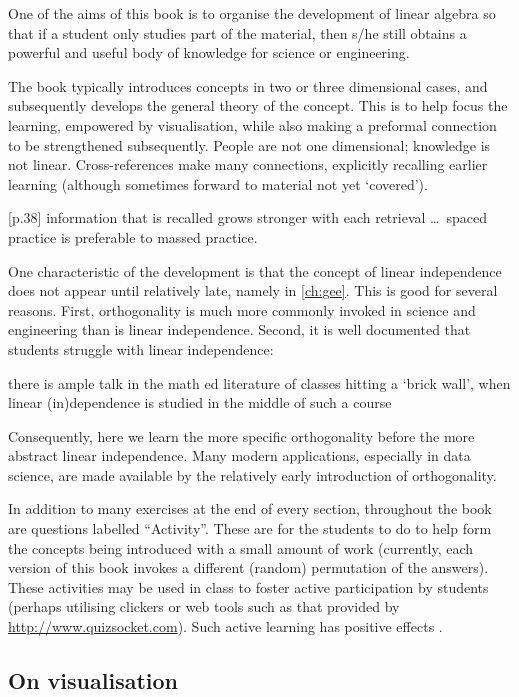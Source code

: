 One of the aims of this book is to organise the development of linear algebra so that if a student only studies part of the material, then s/he still obtains a powerful and useful body of knowledge for science or engineering.

The book typically introduces concepts in two or three dimensional cases, and subsequently develops the general theory of the concept.  
This is to help focus the learning, empowered by visualisation, while also making a preformal connection to be strengthened subsequently.
People are not one dimensional; knowledge is not linear.
Cross-references make many connections, explicitly recalling earlier learning (although sometimes forward to material not yet `covered').
\begin{quoted}{\cite{Halpern2003} [p.38]}
information that is recalled grows stronger with each retrieval \ldots\ spaced practice is preferable to massed practice.
\end{quoted}

One characteristic of the development is that the concept of linear independence does not appear until relatively late, namely in \cref{ch:gee}.
This is good for several reasons.
First, orthogonality is much more commonly invoked in science and engineering than is linear independence.
Second, it is well documented that students struggle with linear independence:
\begin{quoted}{\cite{Uhlig02}}
there is ample talk in the math ed literature of classes hitting a `brick wall', when linear (in)dependence is studied in the middle of such a course
\end{quoted}
Consequently, here we learn the more specific orthogonality before the more abstract linear independence.
Many modern applications, especially in data science, are made available by the relatively early introduction of orthogonality.

In addition to many exercises at the end of every section, throughout the book are questions labelled ``Activity''.
These are for the students to do to help form the concepts being introduced with a small amount of work (currently, each version of this book invokes a different (random) permutation of the answers).
These activities may be used in class to foster active participation by students (perhaps utilising clickers or web tools such as that provided by \url{http://www.quizsocket.com}).
Such active learning has positive effects \cite[]{ED498555}.




\subsection*{On visualisation}

